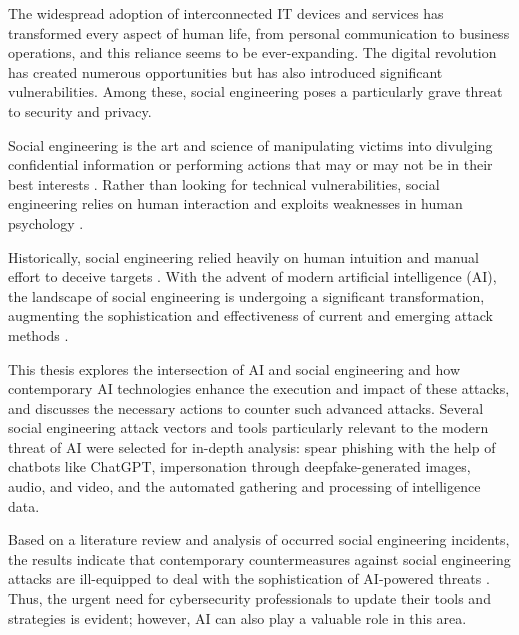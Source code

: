 The widespread adoption of interconnected IT devices and services has transformed every aspect of human life, from personal communication to business operations, and this reliance seems to be ever-expanding. The digital revolution has created numerous opportunities but has also introduced significant vulnerabilities. Among these, social engineering poses a particularly grave threat to security and privacy.

Social engineering is the art and science of manipulating victims into divulging confidential information or performing actions that may or may not be in their best interests \citep{hadnagySocialEngineering2018}. Rather than looking for technical vulnerabilities, social engineering relies on human interaction and exploits weaknesses in human psychology \citep{wangDefiningSocialEngineering2020}.




Historically, social engineering relied heavily on human intuition and manual effort to deceive targets \citep{mitnickArtDeceptionControlling2003}. With the advent of modern artificial intelligence (AI), the landscape of social engineering is undergoing a  significant transformation, augmenting the sophistication and effectiveness of current and emerging attack methods \citep{fakhouriAIDrivenSolutionsForSocialEngineeringAttacks2024}.


This thesis explores the intersection of AI and social engineering and how contemporary AI technologies enhance the execution and impact of these attacks, and discusses the necessary actions to counter such advanced attacks. Several social engineering attack vectors and tools particularly relevant to the modern threat of AI were selected for in-depth analysis: spear phishing with the help of chatbots like ChatGPT, impersonation through deepfake-generated images, audio, and video, and the automated gathering and processing of intelligence data.



Based on a literature review and analysis of occurred social engineering incidents, the results indicate that contemporary countermeasures against social engineering attacks are ill-equipped to deal with the sophistication of AI-powered threats \citep{fakhouriAIDrivenSolutionsForSocialEngineeringAttacks2024, blauthArtificialIntelligenceCrime2022}. Thus, the urgent need for cybersecurity professionals to update their tools and strategies is evident; however, AI can also play a valuable role in this area.






